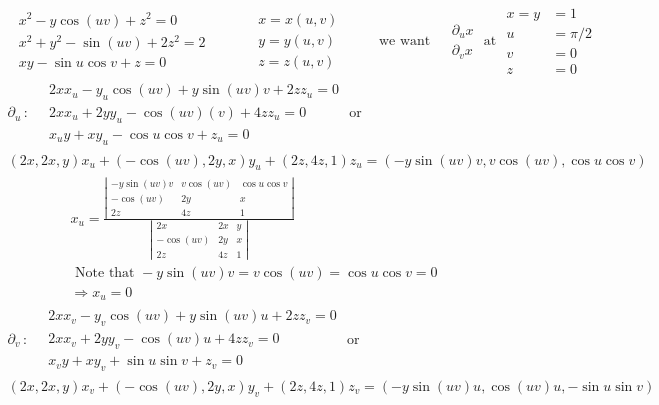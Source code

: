 \documentclass[twoside]{amsart}
\theoremstyle{plain}
\theoremstyle{definition}
\newcommand{\exercisehead}[1]
  {
   \noindent{\small\bf Exercise #1.}
   \smallskip}
\begin{document}
\exercisehead{6} 
\[
\begin{aligned}
  & x^2 - y \cos{(uv)} + z^2 = 0 \\
  & x^2 + y^2 - \sin{ (uv)} + 2z^2  = 2 \\
  & xy - \sin{u} \cos{v} + z = 0 
\end{aligned} \quad \quad \, 
\begin{aligned}
  & x = x(u,v) \\ 
  & y = y(u,v) \\
  & z = z(u,v) 
\end{aligned} \quad \quad \, \text{ we want } \begin{aligned} & \partial_u x \\ & \partial_v x \end{aligned} \text{ at } \begin{aligned}
x = y & = 1 \\ u & = \pi/2 \\ v & = 0 \\ z & = 0 \end{aligned} 
\]
\[
\begin{gathered}
\partial_u \, : \, \begin{aligned} & 2xx_u - y_u \cos{(uv)} + y \sin{(uv)} v + 2zz_u = 0 \\
 & 2x x_u + 2y y_u - \cos{(uv)} (v) + 4 z z_u = 0 \\ & x_u y + xy_u - \cos{u}\cos{v} + z_u = 0 \end{aligned} \text{ or } \\
(2x,2x, y) x_u + (-\cos{(uv)},2y,x) y_u + (2z,4z,1) z_u = (-y\sin{(uv)}v, v\cos{(uv)}, \cos{u} \cos{v} )
\end{gathered}
\]
\[
\begin{gathered}
  x_u = \frac{ \left| \begin{matrix} -y \sin{(uv)}v & v \cos{(uv)} & \cos{u} \cos{v} \\ -\cos{(uv)} & 2y & x \\ 2z & 4z & 1 \end{matrix} \right| }{ \left| \begin{matrix} 2x & 2x & y \\ -\cos{(uv)} & 2y & x \\ 2z & 4z & 1 \end{matrix} \right| }  \\
  \text{ Note that } -y\sin{(uv)} v = v\cos{(uv)} = \cos{u}\cos{v} = 0 \\
  \Longrightarrow x_u = 0 
\end{gathered}
\]
\[
\begin{gathered}
  \partial_v \, : \, \begin{aligned} & 2xx_v - y_v \cos{(uv)} + y \sin{(uv)} u + 2zz_v = 0 \\ & 2xx_v  + 2 y y_v - \cos{(uv)} u + 4zz_v = 0 \\ & x_v y + xy_v + \sin{u} \sin{v} + z_v = 0 \end{aligned} \text{ or } \\
  (2x,2x,y)x_v + (-\cos{(uv)} , 2y, x ) y_v + (2z,4z,1) z_v = (-y\sin{(uv)} u, \cos{(uv)} u , -\sin{u} \sin{v} ) 
\end{gathered}
\]
\end{document}
